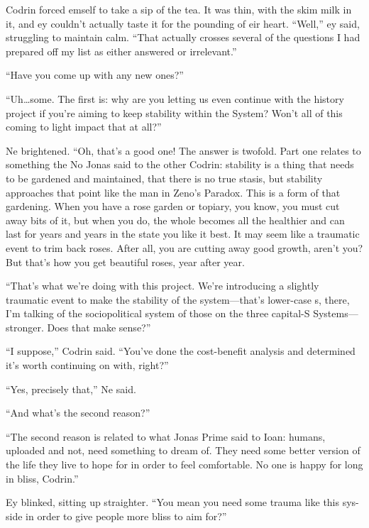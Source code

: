 Codrin forced emself to take a sip of the tea. It was thin, with the skim milk in it, and ey couldn't actually taste it for the pounding of eir heart. ``Well,'' ey said, struggling to maintain calm. ``That actually crosses several of the questions I had prepared off my list as either answered or irrelevant.''

``Have you come up with any new ones?''

``Uh\ldots some. The first is: why are you letting us even continue with the history project if you're aiming to keep stability within the System? Won't all of this coming to light impact that at all?''

Ne brightened. ``Oh, that's a good one! The answer is twofold. Part one relates to something the No Jonas said to the other Codrin: stability is a thing that needs to be gardened and maintained, that there is no true stasis, but stability approaches that point like the man in Zeno's Paradox. This is a form of that gardening. When you have a rose garden or topiary, you know, you must cut away bits of it, but when you do, the whole becomes all the healthier and can last for years and years in the state you like it best. It may seem like a traumatic event to trim back roses. After all, you are cutting away good growth, aren't you? But that's how you get beautiful roses, year after year.

``That's what we're doing with this project. We're introducing a slightly traumatic event to make the stability of the system---that's lower-case s, there, I'm talking of the sociopolitical system of those on the three capital-S Systems---stronger. Does that make sense?''

``I suppose,'' Codrin said. ``You've done the cost-benefit analysis and determined it's worth continuing on with, right?''

``Yes, precisely that,'' Ne said.

``And what's the second reason?''

``The second reason is related to what Jonas Prime said to Ioan: humans, uploaded and not, need something to dream of. They need some better version of the life they live to hope for in order to feel comfortable. No one is happy for long in bliss, Codrin.''

Ey blinked, sitting up straighter. ``You mean you need some trauma like this sys-side in order to give people more bliss to aim for?''

